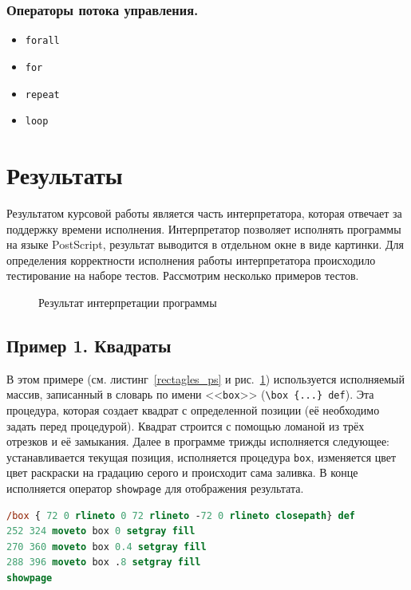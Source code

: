 \subsubsection*{Операторы потока управления.}
\begin{itemize}
\item \texttt{forall}
\item \texttt{for}
\item \texttt{repeat}
\item \texttt{loop}
\end{itemize}
\fi
\section{Результаты}
Результатом курсовой работы является часть интерпретатора, которая отвечает за поддержку времени исполнения. Интерпретатор позволяет исполнять программы на языке PostScript, результат выводится в отдельном окне в виде картинки. Для определения корректности исполнения работы интерпретатора происходило тестирование на наборе тестов. Рассмотрим несколько примеров тестов.

\begin{figure}[t]
\caption{Результат интерпретации программы}\label{rectangles}
\end{figure}

\subsection{Пример 1. Квадраты}
В этом примере (см. листинг~\ref{rectagles_ps} и рис.~\ref{rectangles}) используется исполняемый массив, записанный в словарь по имени <<\texttt{box}>> (\texttt{\textbackslash box \{...\} def}). Эта процедура, которая создает квадрат с определенной позиции (её необходимо задать перед процедурой). Квадрат строится с помощью ломаной из трёх отрезков и её замыкания. Далее в программе трижды исполняется следующее: устанавливается текущая позиция, исполняется процедура \texttt{box}, изменяется цвет цвет раскраски на градацию серого и происходит сама заливка. В конце исполняется оператор \texttt{showpage} для отображения результата.
\begin{lstlisting}[label=rectagles_ps,caption=Три квадрата, frame = none, language = PostScript]
/box { 72 0 rlineto 0 72 rlineto -72 0 rlineto closepath} def
252 324 moveto box 0 setgray fill
270 360 moveto box 0.4 setgray fill
288 396 moveto box .8 setgray fill
showpage 
\end{lstlisting}

